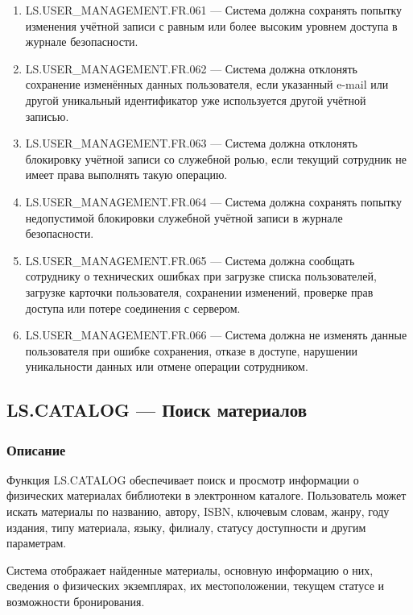 \documentclass[12pt,a4paper]{article}
\begin{document}
\begin{enumerate}
		\item LS.USER\_MANAGEMENT.FR.061 --- Система должна сохранять попытку
		изменения учётной записи с равным или более высоким уровнем доступа в журнале
		безопасности.
		
		\item LS.USER\_MANAGEMENT.FR.062 --- Система должна отклонять сохранение
		изменённых данных пользователя, если указанный e-mail или другой уникальный
		идентификатор уже используется другой учётной записью.
		
		\item LS.USER\_MANAGEMENT.FR.063 --- Система должна отклонять блокировку
		учётной записи со служебной ролью, если текущий сотрудник не имеет права
		выполнять такую операцию.
		
		\item LS.USER\_MANAGEMENT.FR.064 --- Система должна сохранять попытку
		недопустимой блокировки служебной учётной записи в журнале безопасности.
		
		\item LS.USER\_MANAGEMENT.FR.065 --- Система должна сообщать сотруднику о
		технических ошибках при загрузке списка пользователей, загрузке карточки
		пользователя, сохранении изменений, проверке прав доступа или потере соединения
		с сервером.
		
		\item LS.USER\_MANAGEMENT.FR.066 --- Система должна не изменять данные
		пользователя при ошибке сохранения, отказе в доступе, нарушении уникальности
		данных или отмене операции сотрудником.
	\end{enumerate}
	
	\subsection{LS.CATALOG --- Поиск материалов}
	
	\subsubsection{Описание}
	
	Функция LS.CATALOG обеспечивает поиск и просмотр информации о физических
	материалах библиотеки в электронном каталоге. Пользователь может искать
	материалы по названию, автору, ISBN, ключевым словам, жанру, году издания,
	типу материала, языку, филиалу, статусу доступности и другим параметрам.
	
	Система отображает найденные материалы, основную информацию о них, сведения
	о физических экземплярах, их местоположении, текущем статусе и возможности
	бронирования.
	
\end{document}
